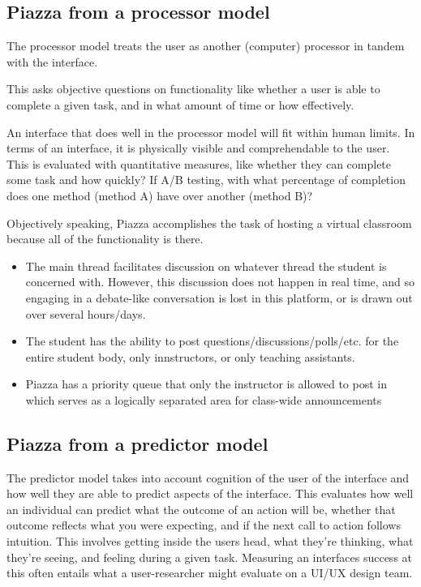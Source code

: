 \subsection{Piazza from a processor model}

The processor model treats the user as another (computer) processor in tandem with the interface.

\clearpage

This asks objective questions on functionality like whether a user is able to complete a given task, and in what amount of time or how effectively.

An interface that does well in the processor model will fit within human limits. In terms of an interface, it is physically visible and comprehendable to the user. This is evaluated with quantitative measures, like whether they can complete some task and how quickly? If A/B testing, with what percentage of completion does one method (method A) have over another (method B)?

Objectively speaking, Piazza accomplishes the task of hosting a virtual classroom because all of the functionality is there.

\begin{itemize}
\item
  The main thread facilitates discussion on whatever thread the student is concerned with. However, this discussion does not happen in real time, and so engaging in a debate-like conversation is lost in this platform, or is drawn out over several hours/days.
\item
  The student has the ability to post questions/discussions/polls/etc. for the entire student body, only innstructors, or only teaching assistants.
\item
  Piazza has a priority queue that only the instructor is allowed to post in which serves as a logically separated area for class-wide announcements
\end{itemize}

\subsection{Piazza from a predictor model}

The predictor model takes into account cognition of the user of the interface and how well they are able to predict aspects of the interface. This evaluates how well an individual can predict what the outcome of an action will be, whether that outcome reflects what you were expecting, and if the next call to action follows intuition. This involves getting inside the users head, what they're thinking, what they're seeing, and feeling during a given task. Measuring an interfaces success at this often entails what a user-researcher might evaluate on a UI/UX design team.

